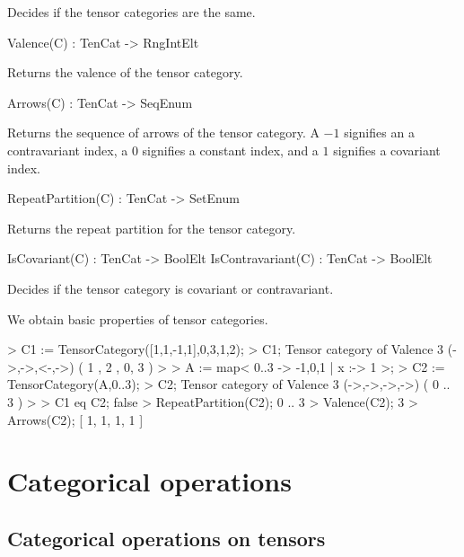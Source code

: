 Decides if the tensor categories are the same.

\begin{intrinsics}
Valence(C) : TenCat -> RngIntElt
\end{intrinsics}

Returns the valence of the tensor category.

\begin{intrinsics}
Arrows(C) : TenCat -> SeqEnum
\end{intrinsics}

Returns the sequence of arrows of the tensor category. 
A $-1$ signifies an a contravariant index, a $0$ signifies a constant index, and a $1$ signifies a covariant index.

\begin{intrinsics}
RepeatPartition(C) : TenCat -> SetEnum
\end{intrinsics}

Returns the repeat partition for the tensor category.

\begin{intrinsics}
IsCovariant(C) : TenCat -> BoolElt
IsContravariant(C) : TenCat -> BoolElt
\end{intrinsics}

Decides if the tensor category is covariant or contravariant.

\begin{example}
We obtain basic properties of tensor categories.

\begin{code}
> C1 := TensorCategory([1,1,-1,1],{{0,3},{1},{2}});
> C1;
Tensor category of Valence 3 (->,->,<-,->) ({ 1 },{ 2 },
{ 0, 3 })
> 
> A := map< {0..3} -> {-1,0,1} | x :-> 1 >;
> C2 := TensorCategory(A,{{0..3}});
> C2;
Tensor category of Valence 3 (->,->,->,->) ({ 0 .. 3 })
> 
> C1 eq C2;
false
> RepeatPartition(C2);
{
    { 0 .. 3 }
}
> Valence(C2);
3
> Arrows(C2);
[ 1, 1, 1, 1 ]
\end{code}
\end{example}

\section{Categorical operations}

\subsection{Categorical operations on tensors}

